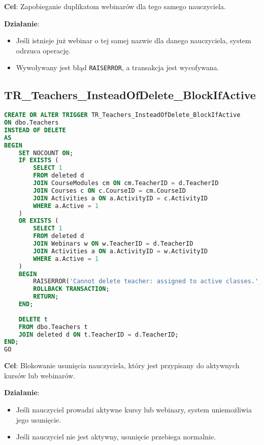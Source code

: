 \documentclass[12pt]{article}
\begin{document}
\noindent \textbf{Cel}: Zapobieganie duplikatom webinarów dla tego samego nauczyciela.

\noindent \textbf{Działanie}:  
\begin{itemize}
    \item Jeśli istnieje już webinar o tej samej nazwie dla danego nauczyciela, system odrzuca operację.
    \item Wywoływany jest błąd \texttt{RAISERROR}, a transakcja jest wycofywana.
\end{itemize}


\newpage
\subsection{TR\_Teachers\_InsteadOfDelete\_BlockIfActive}

\begin{lstlisting}[language=SQL]
CREATE OR ALTER TRIGGER TR_Teachers_InsteadOfDelete_BlockIfActive
ON dbo.Teachers
INSTEAD OF DELETE
AS
BEGIN
    SET NOCOUNT ON;
    IF EXISTS (
        SELECT 1
        FROM deleted d
        JOIN CourseModules cm ON cm.TeacherID = d.TeacherID
        JOIN Courses c ON c.CourseID = cm.CourseID
        JOIN Activities a ON a.ActivityID = c.ActivityID
        WHERE a.Active = 1
    )
    OR EXISTS (
        SELECT 1
        FROM deleted d
        JOIN Webinars w ON w.TeacherID = d.TeacherID
        JOIN Activities a ON a.ActivityID = w.ActivityID
        WHERE a.Active = 1
    )
    BEGIN
        RAISERROR('Cannot delete teacher: assigned to active classes.', 16, 1);
        ROLLBACK TRANSACTION;
        RETURN;
    END;
    
    DELETE t
    FROM dbo.Teachers t
    JOIN deleted d ON t.TeacherID = d.TeacherID;
END;
GO
\end{lstlisting}

\noindent \textbf{Cel}: Blokowanie usunięcia nauczyciela, który jest przypisany do aktywnych kursów lub webinarów.  

\noindent \textbf{Działanie}:  
\begin{itemize}
    \item Jeśli nauczyciel prowadzi aktywne kursy lub webinary, system uniemożliwia jego usunięcie.
    \item Jeśli nauczyciel nie jest aktywny, usunięcie przebiega normalnie.
\end{itemize}

\vspace{1em}

\newpage
\end{document}

